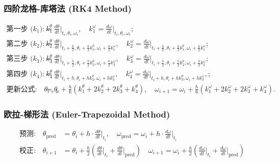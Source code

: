 \subsubsection{四阶龙格-库塔法 (RK4 Method)}

\[
\begin{aligned}
\text{第一步 (\(k_1\)):} \quad
k_1^\theta &= \frac{d\theta}{dt} \bigg|_{t_i, \theta_i, \omega_i}, \quad
k_1^\omega = \frac{d\omega}{dt} \bigg|_{t_i, \theta_i, \omega_i}; \\
\text{第二步 (\(k_2\)):} \quad
k_2^\theta &= \frac{d\theta}{dt} \bigg|_{t_i + \frac{h}{2}, \theta_i + \frac{h}{2} k_1^\theta, \omega_i + \frac{h}{2} k_1^\omega}, \quad 
k_2^\omega = \frac{d\omega}{dt} \bigg|_{t_i + \frac{h}{2}, \theta_i + \frac{h}{2} k_1^\theta, \omega_i + \frac{h}{2} k_1^\omega}; \\
\text{第三步 (\(k_3\)):} \quad
k_3^\theta &= \frac{d\theta}{dt} \bigg|_{t_i + \frac{h}{2}, \theta_i + \frac{h}{2} k_2^\theta, \omega_i + \frac{h}{2} k_2^\omega}, \quad
k_3^\omega = \frac{d\omega}{dt} \bigg|_{t_i + \frac{h}{2}, \theta_i + \frac{h}{2} k_2^\theta, \omega_i + \frac{h}{2} k_2^\omega}; \\
\text{第四步 (\(k_4\)):} \quad
k_4^\theta &= \frac{d\theta}{dt} \bigg|_{t_i + h, \theta_i + h k_3^\theta, \omega_i + h k_3^\omega}, \quad
k_4^\omega = \frac{d\omega}{dt} \bigg|_{t_i + h, \theta_i + h k_3^\theta, \omega_i + h k_3^\omega},;\\
\text{更新公式:} \quad
\theta_{i+1} &= \theta_i + \frac{h}{6} \left(k_1^\theta + 2k_2^\theta + 2k_3^\theta + k_4^\theta \right), \quad
\omega_{i+1} = \omega_i + \frac{h}{6} \left(k_1^\omega + 2k_2^\omega + 2k_3^\omega + k_4^\omega \right).
\end{aligned}
\]

\subsubsection{欧拉-梯形法 (Euler-Trapezoidal Method)}

\[
\begin{aligned}
\text{预测:} \quad
\theta_{\text{pred}} &= \theta_i + h \cdot \frac{d\theta}{dt} \bigg|_{t_i}, \quad
\omega_{\text{pred}} = \omega_i + h \cdot \frac{d\omega}{dt} \bigg|_{t_i} \\
\text{校正:} \quad
\theta_{i+1} &= \theta_i + \frac{h}{2} \left( \frac{d\theta}{dt} \bigg|_{t_i} + \frac{d\theta}{dt} \bigg|_{\text{pred}} \right) \quad
\omega_{i+1} = \omega_i + \frac{h}{2} \left( \frac{d\omega}{dt} \bigg|_{t_i} + \frac{d\omega}{dt} \bigg|_{\text{pred}} \right)
\end{aligned}
\]
